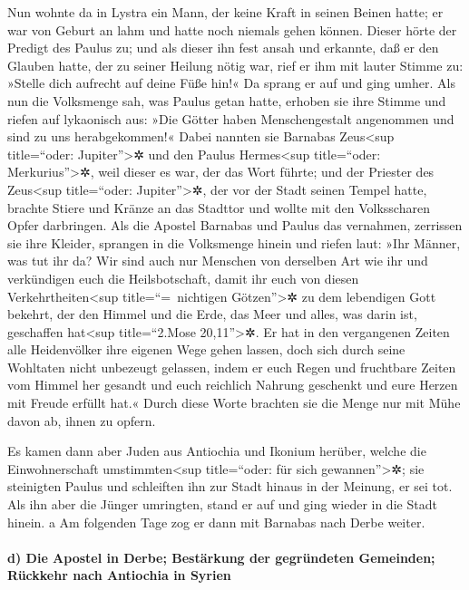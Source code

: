  Nun wohnte da in Lystra ein Mann, der keine Kraft in
seinen Beinen hatte; er war von Geburt an lahm und hatte noch niemals
gehen können.  Dieser hörte der Predigt des Paulus zu; und
als dieser ihn fest ansah und erkannte, daß er den Glauben hatte, der zu
seiner Heilung nötig war,  rief er ihm mit lauter Stimme
zu: »Stelle dich aufrecht auf deine Füße hin!« Da sprang er auf und ging
umher.  Als nun die Volksmenge sah, was Paulus getan
hatte, erhoben sie ihre Stimme und riefen auf lykaonisch aus: »Die
Götter haben Menschengestalt angenommen und sind zu uns herabgekommen!«
 Dabei nannten sie Barnabas Zeus\textless sup
title=``oder: Jupiter''\textgreater✲ und den Paulus Hermes\textless sup
title=``oder: Merkurius''\textgreater✲, weil dieser es war, der das Wort
führte;  und der Priester des Zeus\textless sup
title=``oder: Jupiter''\textgreater✲, der vor der Stadt seinen Tempel
hatte, brachte Stiere und Kränze an das Stadttor und wollte mit den
Volksscharen Opfer darbringen.  Als die Apostel Barnabas
und Paulus das vernahmen, zerrissen sie ihre Kleider, sprangen in die
Volksmenge hinein  und riefen laut: »Ihr Männer, was tut
ihr da? Wir sind auch nur Menschen von derselben Art wie ihr und
verkündigen euch die Heilsbotschaft, damit ihr euch von diesen
Verkehrtheiten\textless sup title=``=~nichtigen Götzen''\textgreater✲ zu
dem lebendigen Gott bekehrt, der den Himmel und die Erde, das Meer und
alles, was darin ist, geschaffen hat\textless sup title=``2.Mose
20,11''\textgreater✲.  Er hat in den vergangenen Zeiten
alle Heidenvölker ihre eigenen Wege gehen lassen,  doch
sich durch seine Wohltaten nicht unbezeugt gelassen, indem er euch Regen
und fruchtbare Zeiten vom Himmel her gesandt und euch reichlich Nahrung
geschenkt und eure Herzen mit Freude erfüllt hat.«  Durch
diese Worte brachten sie die Menge nur mit Mühe davon ab, ihnen zu
opfern.

 Es kamen dann aber Juden aus Antiochia und Ikonium
herüber, welche die Einwohnerschaft umstimmten\textless sup
title=``oder: für sich gewannen''\textgreater✲; sie steinigten Paulus
und schleiften ihn zur Stadt hinaus in der Meinung, er sei tot.
 Als ihn aber die Jünger umringten, stand er auf und ging
wieder in die Stadt hinein.  a Am folgenden Tage zog er
dann mit Barnabas nach Derbe weiter.

\hypertarget{d-die-apostel-in-derbe-bestuxe4rkung-der-gegruxfcndeten-gemeinden-ruxfcckkehr-nach-antiochia-in-syrien}{%
\paragraph{d) Die Apostel in Derbe; Bestärkung der gegründeten
Gemeinden; Rückkehr nach Antiochia in
Syrien}\label{d-die-apostel-in-derbe-bestuxe4rkung-der-gegruxfcndeten-gemeinden-ruxfcckkehr-nach-antiochia-in-syrien}}

